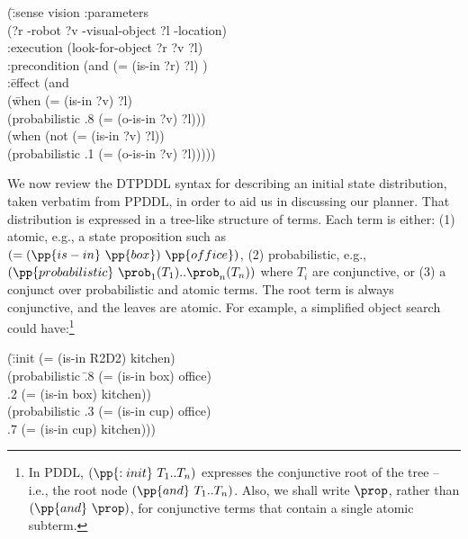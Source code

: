 \vspace{-1ex}
\small
\begin{tabtt}
(\= :sense vision  :parameters \+ \\
  (?r -robot ?v -visual-object ?l -location) \\
 :execution  (look-for-object ?r ?v ?l) \\
 :precondition (and (= (is-in ?r) ?l) ) \\
 :\=effect (and \+\\
    (\= when (= (is-in ?v) ?l)\\
    \>(probabilistic .8 (= (o-is-in ?v) ?l))) \\
   (when (not (= (is-in ?v) ?l)) \\
    \>(probabilistic .1 (= (o-is-in ?v) ?l))))) \\
\end{tabtt}
\normalsize
\vspace{-3ex}

We now review the DTPDDL syntax for describing an initial state
distribution, taken verbatim from PPDDL, in order to aid us in
discussing our planner. That distribution is expressed in a tree-like
structure of terms. Each term is either: (1) atomic, e.g., a state
proposition such as $(=(\pp{is-in}~\pp{box})~\pp{office})$, (2)
probabilistic, e.g., $(\pp{probabilistic}~\prob_1 (T_1) .. \prob_n
(T_n))$ where $T_i$ are conjunctive, or (3) a conjunct over
probabilistic and atomic terms. The root term is always conjunctive,
and the leaves are atomic. For example, a simplified object search
could have:\footnote{In PDDL, $(\pp{:init}~T_1..T_n)$ expresses the
conjunctive root of the tree -- i.e., the root node
$(\pp{and}~T_1..T_n)$. Also, we shall write $\prop$, rather than
$(\pp{and}~\prop)$, for conjunctive terms that contain a single atomic
subterm.}

\vspace{-1ex}
\small
\begin{tabtt}
(\=:init (= (is-in R2D2) kitchen) \+ \\
       (probabilistic \=.8 (= (is-in box) office)  \\
		      \>.2 (= (is-in box) kitchen)) \\
       (probabilistic .3 (= (is-in cup) office)  \\
		      \>.7 (= (is-in cup) kitchen))) \\
\end{tabtt}
\normalsize

\vspace{-3ex}

